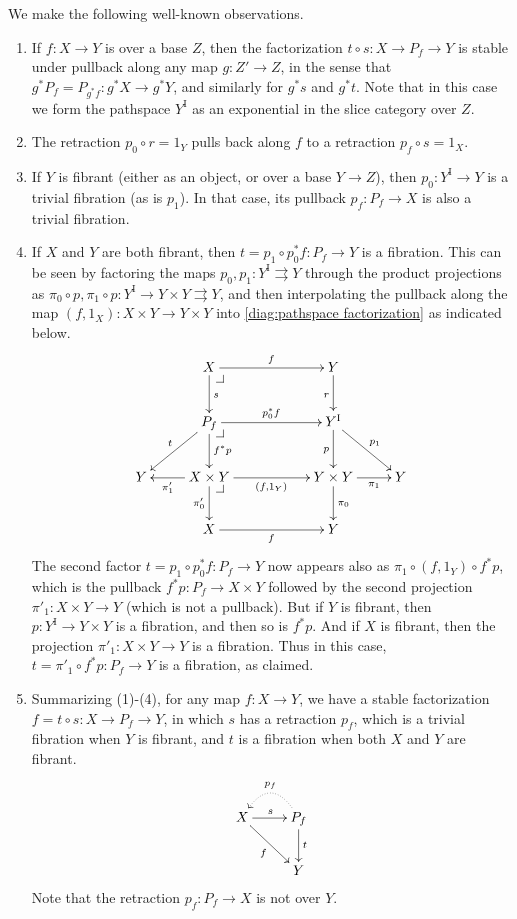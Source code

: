 \documentclass[12pt]{article}
\makeatletter
\newcommand{\pbcorner}[1][dr]{\save*!/#1-1.2pc/#1:(-1,1)@^{|-}\restore}
\newcommand{\ra}{\ensuremath{\rightarrow}}
\newcommand{\I}{\ensuremath{\mathrm{I}}}
\theoremstyle{remark}
\theoremstyle{definition}
\makeatother
\begin{document}
We make the following well-known observations.
\begin{enumerate}
\item If $f:X\ra Y$ is over a base $Z$, then the factorization $t\circ s:X\ra P_f \ra Y$ is stable under pullback along any map $g : Z' \ra Z$, in the sense that $g^*P_f = P_{g^*f} : g^*X \ra g^* Y$, and similarly for $g^*s$ and $g^*t$.  Note that in this case we form the pathspace $Y^\I$ as an exponential in the slice category over $Z$.

\item The retraction $p_0\circ r = 1_Y$ pulls back along $f$ to a retraction $p_f \circ s =1_X$.

\item If $Y$ is fibrant (either as an object, or over a base $Y\ra Z$), then $p_0 : Y^\I \ra Y$ is a trivial fibration (as is $p_1$).  In that case, its pullback $p_f : P_f \ra X$ is also a trivial fibration.

\item If $X$ and $Y$ are both fibrant, then $t= p_1\circ p_0^*f : P_f \ra Y$ is a fibration.  This can be seen by factoring the maps $p_0, p_1 :Y^\I \rightrightarrows  Y$ through the product projections as $\pi_0\circ p, \pi_1\circ p : Y^\I \ra Y\times Y \rightrightarrows Y$, and then interpolating the pullback along the map $(f,1_X) : X\times Y\ra Y\times Y$ into \eqref{diag:pathspace factorization} as indicated below.
\begin{equation}\label{diag:pathspace factorization2}
\xymatrix{
& X \ar[d]^s \ar[rr]^f \pbcorner && Y \ar[d]_r \\
& \ar[ld]_t P_f  \ar[d]^{f^*p} \ar[rr]^{p_0^*f} \pbcorner && Y^\I \ar[d]_{p} \ar[rd]^{p_1}\\
Y & \ar[l]^-{\pi'_1} X\times Y\ar[d]_-{\pi'_0} \ar[rr]_{(f,1_Y)} \pbcorner  &&  Y\times Y \ar[d]^{\pi_0} \ar[r]_-{\pi_1} & Y \\
& X \ar[rr]_f  &&  Y &
}
\end{equation}
The second factor $t = p_1\circ p_0^*f : P_f \ra Y$ now appears also as $\pi_1\circ(f,1_Y)\circ f^*p$, which is the pullback $f^*p: P_f \ra X\times Y$ followed by the second projection $\pi'_1 : X\times Y \ra Y$ (which is not a pullback). But if $Y$ is fibrant, then $p : Y^\I \ra Y\times Y$ is a fibration, and then so is $f^*p$. And if $X$ is fibrant, then the projection $\pi'_1:X\times Y \ra Y$ is a fibration. Thus in this case, $t = \pi'_1\circ f^*p : P_f \ra Y$ is a fibration, as claimed.

\item Summarizing (1)-(4), for any map $f : X\ra Y$, we have a stable factorization $f = t\circ s : X\ra P_f \ra Y$, in which $s$ has a retraction $p_f$, which is a trivial fibration when $Y$ is fibrant, and $t$ is a fibration when both $X$ and $Y$ are fibrant.  \begin{equation}\label{diag:pathspace factorization3}
\xymatrix{
X \ar[r]^s \ar[rd]_f & \ar@{.>}@/_1.5pc/[l]_{p_f} P_f \ar[d]^t \\
& Y
}
\end{equation}
Note that the retraction $p_f : P_f \ra X$ is not over $Y$.
\end{enumerate}
\end{document}
